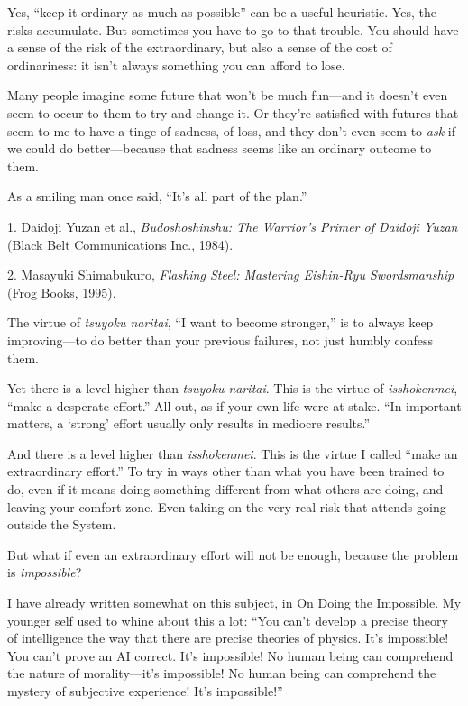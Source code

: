 {
 Yes, ``keep it ordinary as much as
possible'' can be a useful heuristic. Yes, the risks
accumulate. But sometimes you have to go to that trouble. You should
have a sense of the risk of the extraordinary, but also a sense of the
cost of ordinariness: it isn't always something you can
afford to lose.}

{
 Many people imagine some future that won't be much
fun---and it doesn't even seem to occur to them to try
and change it. Or they're satisfied with futures that
seem to me to have a tinge of sadness, of loss, and they
don't even seem to \textit{ask} if we could do
better---because that sadness seems like an ordinary outcome to them.}

{
 As a smiling man once said,
``It's all part of the
plan.''}

\myendsectiontext


\bigskip

{
 1. Daidoji Yuzan et al., \textit{Budoshoshinshu: The
Warrior's Primer of Daidoji Yuzan} (Black Belt
Communications Inc., 1984).}

{
 2. Masayuki Shimabukuro, \textit{Flashing Steel: Mastering
Eishin-Ryu Swordsmanship} (Frog Books, 1995).}


{
 The virtue of \textit{tsuyoku naritai}, ``I want
to become stronger,'' is to always keep
improving---to do better than your previous failures, not just humbly
confess them. }

{
 Yet there is a level higher than \textit{tsuyoku naritai}. This is
the virtue of \textit{isshokenmei}, ``make a desperate
effort.'' All-out, as if your own life were at stake.
``In important matters, a
`strong' effort usually only results in
mediocre results.''}

{
 And there is a level higher than \textit{isshokenmei}. This is the
virtue I called ``make an extraordinary
effort.'' To try in ways other than what you have
been trained to do, even if it means doing something different from
what others are doing, and leaving your comfort zone. Even taking on
the very real risk that attends going outside the System.}

{
 But what if even an extraordinary effort will not be enough,
because the problem is \textit{impossible}?}

{
 I have already written somewhat on this subject, in On Doing the
Impossible. My younger self used to whine about this a lot:
``You can't develop a precise theory
of intelligence the way that there are precise theories of physics.
It's impossible! You can't prove an AI
correct. It's impossible! No human being can comprehend
the nature of morality---it's impossible! No human
being can comprehend the mystery of subjective experience!
It's impossible!''}

